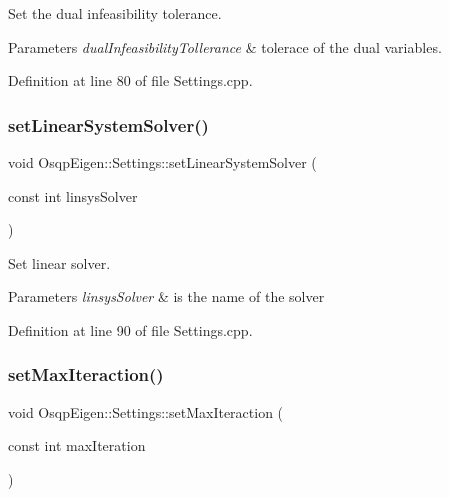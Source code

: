 Set the dual infeasibility tolerance. 


\begin{DoxyParams}{Parameters}
{\em dual\+Infeasibility\+Tollerance} & tolerace of the dual variables. \\
\hline
\end{DoxyParams}


Definition at line 80 of file Settings.\+cpp.

\mbox{\label{classOsqpEigen_1_1Settings_a42e2f3d0fcf93c0a22ba2bb30599c1d3}} 
\subsubsection{\texorpdfstring{set\+Linear\+System\+Solver()}{setLinearSystemSolver()}}
{\footnotesize\ttfamily void Osqp\+Eigen\+::\+Settings\+::set\+Linear\+System\+Solver (\begin{DoxyParamCaption}\item[{const int}]{linsys\+Solver }\end{DoxyParamCaption})}



Set linear solver. 


\begin{DoxyParams}{Parameters}
{\em linsys\+Solver} & is the name of the solver \\
\hline
\end{DoxyParams}


Definition at line 90 of file Settings.\+cpp.

\mbox{\label{classOsqpEigen_1_1Settings_ac670100dbf41f46a99122b58795038da}} 
\subsubsection{\texorpdfstring{set\+Max\+Iteraction()}{setMaxIteraction()}}
{\footnotesize\ttfamily void Osqp\+Eigen\+::\+Settings\+::set\+Max\+Iteraction (\begin{DoxyParamCaption}\item[{const int}]{max\+Iteration }\end{DoxyParamCaption})}



